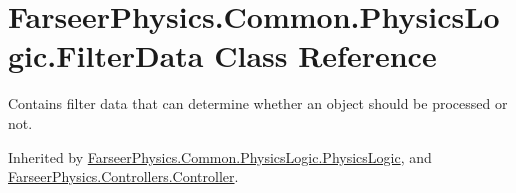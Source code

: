 \hypertarget{class_farseer_physics_1_1_common_1_1_physics_logic_1_1_filter_data}{\section{Farseer\+Physics.\+Common.\+Physics\+Logic.\+Filter\+Data Class Reference}
\label{class_farseer_physics_1_1_common_1_1_physics_logic_1_1_filter_data}
}


Contains filter data that can determine whether an object should be processed or not.  




Inherited by \hyperlink{class_farseer_physics_1_1_common_1_1_physics_logic_1_1_physics_logic}{Farseer\+Physics.\+Common.\+Physics\+Logic.\+Physics\+Logic}, and \hyperlink{class_farseer_physics_1_1_controllers_1_1_controller}{Farseer\+Physics.\+Controllers.\+Controller}.

